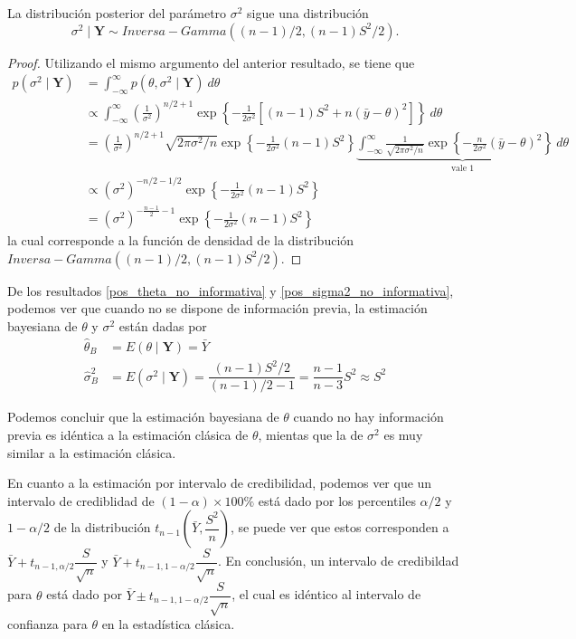 \documentclass[10pt,openright]{book}\usepackage[]{graphicx}\usepackage[]{color}
\begin{document}
\begin{Res}\label{pos_sigma2_no_informativa}
La distribuci\'on posterior del par\'ametro $\sigma^2$ sigue una distribuci\'on
\begin{equation*}
\sigma^2 \mid \mathbf{Y} \sim Inversa-Gamma((n-1)/2,(n-1)S^2/2).
\end{equation*}
\end{Res}

\begin{proof}
Utilizando el mismo argumento del anterior resultado, se tiene que
\begin{align*}
p(\sigma^2 \mid \mathbf{Y})&= \int_{-\infty}^{\infty} p(\theta,\sigma^2 \mid \mathbf{Y}) \ d\theta \\
& \propto \int_{-\infty}^{\infty} \left(\frac{1}{\sigma^2}\right)^{n/2+1}
\exp\left\{-\frac{1}{2\sigma^2}\left[(n-1)S^2+n(\bar{y}-\theta)^2\right]\right\} \ d\theta \\
& = \left(\frac{1}{\sigma^2}\right)^{n/2+1} \sqrt{2\pi\sigma^2/n}\exp\left\{-\frac{1}{2\sigma^2}(n-1)S^2\right\}\underbrace{\int_{-\infty}^{\infty} \frac{1}{\sqrt{2\pi\sigma^2/n}} \exp\left\{-\frac{n}{2\sigma^2}(\bar{y}-\theta)^2\right\} \ d\theta}_{\text{vale $1$}} \\
& \propto (\sigma^2)^{-n/2-1/2}\exp\left\{-\frac{1}{2\sigma^2}(n-1)S^2\right\}\\
&= (\sigma^2)^{-\frac{n-1}{2}-1}\exp\left\{-\frac{1}{2\sigma^2}(n-1)S^2\right\}
\end{align*}
la cual corresponde a la funci\'on de densidad de la distribuci\'on $Inversa-Gamma((n-1)/2,(n-1)S^2/2)$.
\end{proof}

De los resultados \ref{pos_theta_no_informativa} y \ref{pos_sigma2_no_informativa}, podemos ver que cuando no se dispone de informaci\'on previa, la estimaci\'on bayesiana de $\theta$ y $\sigma^2$ est\'an dadas por
\begin{align*}
\hat{\theta}_B&=E(\theta\mid\mathbf{Y})=\bar{Y}\\
\hat{\sigma}^2_B&=E(\sigma^2\mid\mathbf{Y})=\dfrac{(n-1)S^2/2}{(n-1)/2-1}=\dfrac{n-1}{n-3}S^2\approx S^2
\end{align*}

Podemos concluir que la estimaci\'on bayesiana de $\theta$ cuando no hay informaci\'on previa es id\'entica a la estimaci\'on cl\'asica de $\theta$, mientas que la de $\sigma^2$ es muy similar a la estimaci\'on cl\'asica.

En cuanto a la estimaci\'on por intervalo de credibilidad, podemos ver que un intervalo de crediblidad de $(1-\alpha)\times 100\%$ est\'a dado por los percentiles $\alpha/2$ y $1-\alpha/2$ de la distribuci\'on $t_{n-1}\left(\bar{Y},\dfrac{S^2}{n}\right)$, se puede ver que estos corresponden a $\bar{Y}+t_{n-1,\alpha/2}\dfrac{S}{\sqrt{n}}$ y $\bar{Y}+t_{n-1,1-\alpha/2}\dfrac{S}{\sqrt{n}}$. En conclusi\'on, un intervalo de credibildad para $\theta$ est\'a dado por $\bar{Y}\pm t_{n-1,1-\alpha/2}\dfrac{S}{\sqrt{n}}$, el cual es id\'entico al intervalo de confianza para $\theta$ en la estad\'istica cl\'asica.
\end{document}
